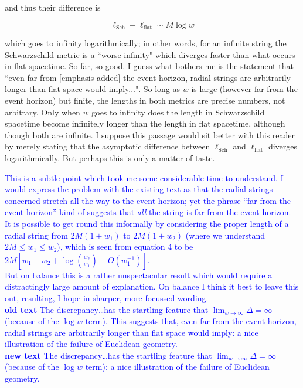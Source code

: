 \documentclass[12pt]{article}
\begin{document}
and thus their difference is

\[
\ell_\mathrm{Sch} - \ell_\mathrm{flat}\sim M\log w
\]

which goes to infinity logarithmically; in other words, for an
infinite string the Schwarzschild metric is a ``worse infinity" which
diverges faster than what occurs in flat spacetime.  So far, so good.
I guess what bothers me is the statement that ``even far from [emphasis
  added] the event horizon, radial strings are arbitrarily longer than
flat space would imply...".  So long as $w$ is large (however far from
the event horizon) but finite, the lengths in both metrics are precise
numbers, not arbitrary.  Only when $w$ goes to infinity does the
length in Schwarzschild spacetime become infinitely longer than the
length in flat spacetime, although though both are infinite.  I
suppose this passage would sit better with this reader by merely
stating that the asymptotic difference between $\ell_\mathrm{Sch}$ and
$\ell_\mathrm{flat}$ diverges logarithmically.  But perhaps this is
only a matter of taste.

\textcolor{blue}{This is a subtle point which took me some
  considerable time to understand.  I would express the problem with
  the existing text as that the radial strings concerned stretch all
  the way to the event horizon; yet the phrase ``far from the event
  horizon'' kind of suggests that {\em all} the string is far from the
  event horizon.\\ It is possible to get round this informally by
  considering the proper length of a radial string from $2M(1+w_1)$ to
  $2M(1+w_2)$ (where we understand $2M\leq w_1\leq w_2$), which is seen from
  equation 4 to be $2M\left[w_1-w_2 + \log\left(\frac{w_2}{w_1}\right) +
  O(w_1^{-1})\right]$.\\ But on balance this is a rather unspectacular result
  which would require a distractingly large amount of explanation.  On
  balance I think it best to leave this out, resulting, I hope in
  sharper, more focussed wording.
\\ {\bf old text}
The discrepancy\ldots has the startling feature that
$\lim_{w\longrightarrow\infty}\Delta=\infty$ (because of the $\log w$
term).  This suggests that, even far from the event horizon, radial
strings are arbitrarily longer than flat space would imply: a nice
illustration of the failure of Euclidean geometry.
\\ {\bf new text}
The discrepancy\ldots has the startling feature that
$\lim_{w\longrightarrow\infty}\Delta=\infty$ (because of the $\log w$
term): a nice illustration of the failure of Euclidean geometry.
}
\end{document}
